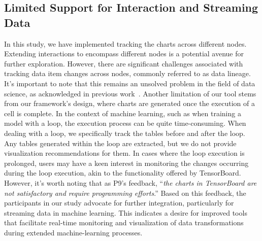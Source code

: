 \subsection{Limited Support for Interaction and Streaming Data}
In this study, we have implemented tracking the charts across different nodes. 
Extending interactions to encompass different nodes is a potential avenue for further exploration.
However, there are significant challenges associated with tracking data item changes across nodes, commonly referred to as data lineage. It's important to note that this remains an unsolved problem in the field of data science, as acknowledged in previous work~\cite{pandastutor}.
Another limitation of our tool stems from our framework's design, where charts are generated once the execution of a cell is complete.
In the context of machine learning, such as when training a model with a  loop, the execution process can be quite time-consuming. When dealing with a  loop, we specifically track the tables before and after the loop. Any tables generated within the loop are extracted, but we do not provide visualization recommendations for them.
In cases where the  loop execution is prolonged, users may have a keen interest in monitoring the changes occurring during the loop execution, akin to the functionality offered by TensorBoard. However, it's worth noting that as P9's feedback, ``\textit{the charts in TensorBoard are not satisfactory and require programming efforts}.''
Based on this feedback, the participants in our study advocate for further integration, particularly for streaming data in machine learning. This indicates a desire for improved tools that facilitate real-time monitoring and visualization of data transformations during extended machine-learning processes.

